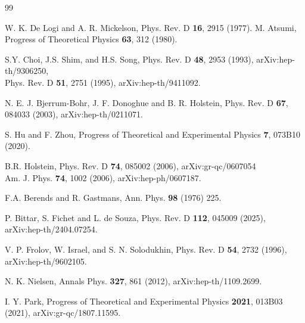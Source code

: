 \documentclass[a4paper,11pt]{article}
\begin{document}
\begin{thebibliography}{99}

W. K. De Logi and A. R. Mickelson, 
Phys. Rev. D {\bf 16}, 2915 (1977).
M. Atsumi, %
Progress of Theoretical Physics {\bf63}, 312 (1980).

S.Y. Choi, J.S. Shim, and H.S. Song, Phys. Rev. D {\bf48}, 2953 (1993), arXiv:hep-th/9306250, \\
 Phys. Rev. D {\bf51}, 2751 (1995), arXiv:hep-th/9411092.

N. E. J. Bjerrum-Bohr, J. F. Donoghue and B. R. Holstein, 
Phys. Rev. D {\bf 67}, 084033 (2003), arXiv:hep-th/0211071.





S. Hu and F. Zhou, %
Progress of Theoretical and Experimental Physics {\bf 7}, 073B10 (2020).

B.R. Holstein, Phys. Rev. D {\bf74}, 085002 (2006), arXiv:gr-qc/0607054\\
Am. J. Phys. {\bf74}, 1002 (2006), arXiv:hep-ph/0607187.




F.A. Berends and R. Gastmans, 
Ann. Phys. {\bf 98} (1976) 225.



P. Bittar, S. Fichet and L. de Souza,
Phys. Rev. D {\bf 112}, 045009 (2025), arXiv:hep-th/2404.07254.

V. P. Frolov, W. Israel, and S. N. Solodukhin, %
Phys. Rev. D {\bf54}, 2732 (1996), arXiv:hep-th/9602105.


N. K. Nielsen, %
Annals Phys. {\bf327}, 861 (2012), arXiv:hep-th/1109.2699.

I. Y. Park, %
Progress of Theoretical and Experimental Physics {\bf 2021}, 013B03 (2021), arXiv:gr-qc/1807.11595.



\end{thebibliography}
\end{document}
